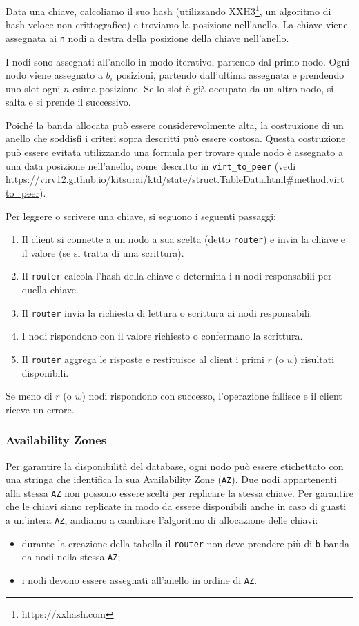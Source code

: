 Data una chiave, calcoliamo il suo hash (utilizzando XXH3\footnote{https://xxhash.com}, un algoritmo di hash veloce non crittografico) e troviamo la posizione nell'anello.
La chiave viene assegnata ai \texttt{n} nodi a destra della posizione della chiave nell'anello.

I nodi sono assegnati all'anello in modo iterativo, partendo dal primo nodo.
Ogni nodo viene assegnato a $b_i$ posizioni, partendo dall'ultima assegnata e prendendo uno slot ogni $n$-esima posizione.
Se lo slot è già occupato da un altro nodo, si salta e si prende il successivo.

Poiché la banda allocata può essere considerevolmente alta, la costruzione di un anello che soddisfi i criteri sopra descritti può essere costosa.
Questa costruzione può essere evitata utilizzando una formula per trovare quale nodo è assegnato a una data posizione nell'anello, come descritto in \texttt{virt\_to\_peer} (vedi \url{https://virv12.github.io/kitsurai/ktd/state/struct.TableData.html#method.virt_to_peer}).

Per leggere o scrivere una chiave, si seguono i seguenti passaggi:
\begin{enumerate}
    \item Il client si connette a un nodo a sua scelta (detto \texttt{router}) e invia la chiave e il valore (se si tratta di una scrittura).
    \item Il \texttt{router} calcola l'hash della chiave e determina i \texttt{n} nodi responsabili per quella chiave.
    \item Il \texttt{router} invia la richiesta di lettura o scrittura ai nodi responsabili.
    \item I nodi rispondono con il valore richiesto o confermano la scrittura.
    \item Il \texttt{router} aggrega le risposte e restituisce al client i primi $r$ (o $w$) risultati disponibili.
\end{enumerate}

Se meno di $r$ (o $w$) nodi rispondono con successo, l'operazione fallisce e il client riceve un errore.

\subsubsection{Availability Zones}
\label{subsubsec:availability-zones}

Per garantire la disponibilità del database, ogni nodo può essere etichettato con una stringa che identifica la sua Availability Zone (\texttt{AZ}).
Due nodi appartenenti alla stessa \texttt{AZ} non possono essere scelti per replicare la stessa chiave.
Per garantire che le chiavi siano replicate in modo da essere disponibili anche in caso di guasti a un'intera \texttt{AZ}, andiamo a cambiare l'algoritmo di allocazione delle chiavi:
\begin{itemize}
    \item durante la creazione della tabella il \texttt{router} non deve prendere più di \texttt{b} banda da nodi nella stessa \texttt{AZ};
    \item i nodi devono essere assegnati all'anello in ordine di \texttt{AZ}.
\end{itemize}

